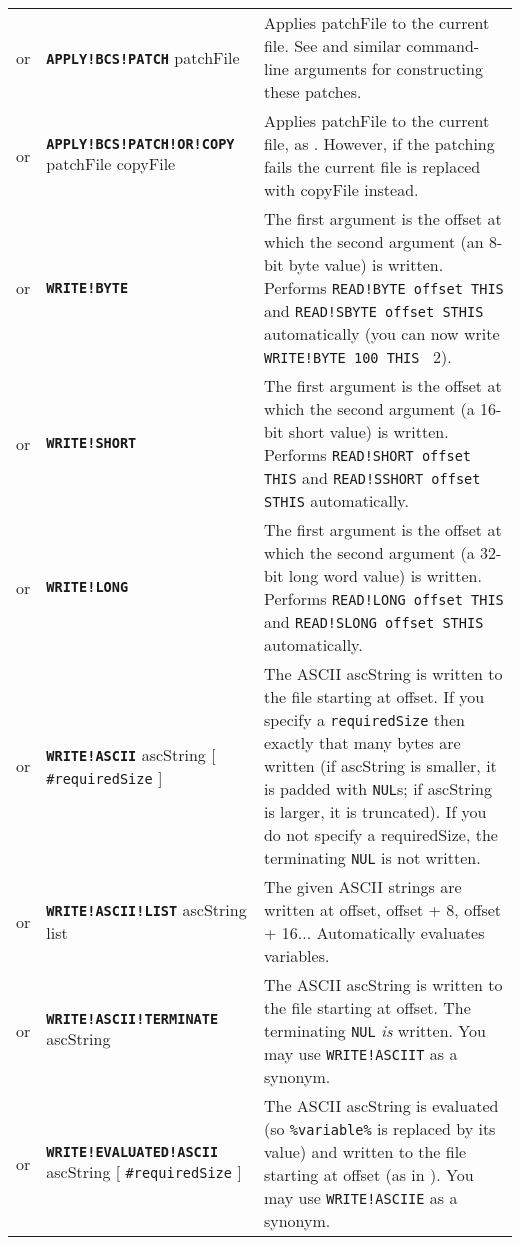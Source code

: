 \documentclass{article}
\def\ttref#1{\ahrefloc{#1}{\tt #1}}
\def\DEFINE#1{{\tt \bf #1}\label{#1}\index{#1}}
\def\t#1{{\tt #1}}
\def\Slist{{\color{red} list }}
\def\Ob{{\color{red} [ }}
\def\Oe{{\color{red} ] }}
\begin{document}
\begin{tabular}{cp{10in}|p{10in}}
or & \DEFINE{APPLY!BCS!PATCH} patchFile &
  Applies patchFile to the current file. See \ttref{--bcmp-from} and similar
  command-line arguments for constructing these patches. \\
or & \DEFINE{APPLY!BCS!PATCH!OR!COPY} patchFile copyFile &
  Applies patchFile to the current file, as \ttref{APPLY!BCS!PATCH}.
  However, if the patching fails the current file is replaced with copyFile
  instead. \\
or & \DEFINE{WRITE!BYTE} \ttref{offset} \ttref{value} &
  The first argument is the offset at which the second argument (an 8-bit
  byte value) is written. Performs \verb+READ!BYTE offset THIS+ and
  \verb+READ!SBYTE offset STHIS+ automatically (you can now write
  \verb+WRITE!BYTE 100 THIS + 2).  \\
or & \DEFINE{WRITE!SHORT} \ttref{offset} \ttref{value} &
  The first argument is the offset at which the second argument (a 16-bit
  short value) is written. Performs \verb+READ!SHORT offset THIS+ and
  \verb+READ!SSHORT offset STHIS+ automatically. \\
or & \DEFINE{WRITE!LONG} \ttref{offset} \ttref{value} &
  The first argument is the offset at which the second argument (a 32-bit
  long word value) is written. Performs \verb+READ!LONG offset THIS+ and
  \verb+READ!SLONG offset STHIS+ automatically. \\
or & \DEFINE{WRITE!ASCII} \ttref{offset} ascString
    \Ob \t{\#requiredSize} \Oe &
  The ASCII ascString is written to the file starting at offset. 
  If you specify a \t{requiredSize} then exactly that many bytes are
  written (if ascString is smaller, it is padded with \t{NUL}s; if
  ascString is larger, it is truncated). If you do not specify a requiredSize,
  the terminating \t{NUL} is not written. \\
or & \DEFINE{WRITE!ASCII!LIST} \ttref{offset} ascString \Slist &
  The given ASCII strings are written at offset, offset + 8, offset + 16...
  Automatically evaluates variables. \\
or & \DEFINE{WRITE!ASCII!TERMINATE} \ttref{offset} ascString &
  The ASCII ascString is written to the file starting at offset.
  The terminating \t{NUL} \emph{is} written. You may use 
  \t{WRITE!ASCIIT} as a synonym. \\
or & \DEFINE{WRITE!EVALUATED!ASCII} \ttref{offset} ascString
    \Ob \t{\#requiredSize} \Oe &
  The ASCII ascString is evaluated (so \t{\%variable\%} is replaced by its
  value) and written to the file starting at offset (as in
  \ttref{WRITE!ASCII}). You may use \t{WRITE!ASCIIE} as a synonym. \\

\end{tabular}
\end{document}
